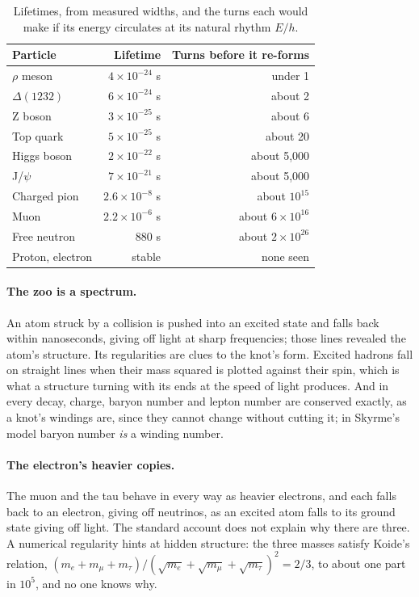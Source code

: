 \documentclass[11pt,a4paper]{article}
\begin{document}
\begin{table}[H]
\centering
\small
\renewcommand{\arraystretch}{1.2}
\begin{tabular}{@{}lrr@{}}
\toprule
\textbf{Particle} & \textbf{Lifetime} & \textbf{Turns before it re-forms} \\
\midrule
$\rho$ meson & $4\times10^{-24}$ s & under 1 \\
$\Delta(1232)$ & $6\times10^{-24}$ s & about 2 \\
Z boson & $3\times10^{-25}$ s & about 6 \\
Top quark & $5\times10^{-25}$ s & about 20 \\
Higgs boson & $2\times10^{-22}$ s & about 5{,}000 \\
J/$\psi$ & $7\times10^{-21}$ s & about 5{,}000 \\
Charged pion & $2.6\times10^{-8}$ s & about $10^{15}$ \\
Muon & $2.2\times10^{-6}$ s & about $6\times10^{16}$ \\
Free neutron & 880 s & about $2\times10^{26}$ \\
Proton, electron & stable & none seen \\
\bottomrule
\end{tabular}
\caption{Lifetimes, from measured widths, and the turns each would make if its energy circulates at its natural rhythm $E/h$. \hyptag}
\label{tab:turns}
\end{table}

\paragraph{The zoo is a spectrum.} An atom struck by a collision is pushed into an excited state and falls back within nanoseconds, giving off light at sharp frequencies; those lines revealed the atom's structure.  Its regularities are clues to the knot's form. Excited hadrons fall on straight lines when their mass squared is plotted against their spin, which is what a structure turning with its ends at the speed of light produces. And in every decay, charge, baryon number and lepton number are conserved exactly, as a knot's windings are, since they cannot change without cutting it; in Skyrme's model baryon number \emph{is} a winding number.

\paragraph{The electron's heavier copies.} The muon and the tau behave in every way as heavier electrons, and each falls back to an electron, giving off neutrinos, as an excited atom falls to its ground state giving off light.  The standard account does not explain why there are three. A numerical regularity hints at hidden structure: the three masses satisfy Koide's relation, $(m_e + m_\mu + m_\tau)/(\sqrt{m_e}+\sqrt{m_\mu}+\sqrt{m_\tau})^2 = 2/3$, to about one part in $10^5$, and no one knows why. 
\end{document}
